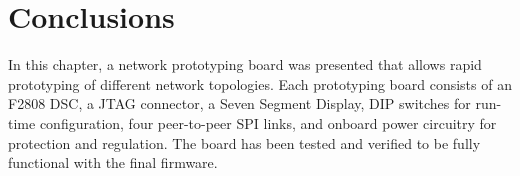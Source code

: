 \section{Conclusions}\label{sec:hardware:conclusions}

In this chapter, a network prototyping board was presented that allows rapid prototyping of different network topologies. Each prototyping board consists of an F2808 DSC, a JTAG connector, a Seven Segment Display, DIP switches for run-time configuration, four peer-to-peer SPI links, and onboard power circuitry for protection and regulation. The board has been tested and verified to be fully functional with the final firmware. 


